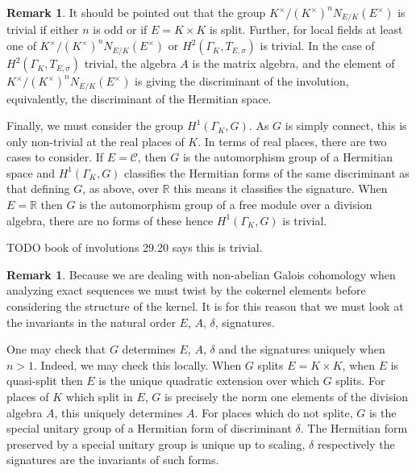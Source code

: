 \documentclass{article}
\theoremstyle{plain}
\theoremstyle{definition}
\newtheorem{remark}[theorem]{Remark}
\numberwithin{equation}{section}
\newcommand{\C}{\mathcal{C}}
\newcommand{\RR}{\mathbb{R}}
\newcommand{\GalKbK}{\Gamma_K}
\begin{document}
\begin{remark}
It should be pointed out that the group $K^\times/(K^\times)^nN_{E/K}(E^\times)$ is trivial if either $n$ is odd or if $E = K\times K$ is split.
Further, for local fields at least one of $K^\times/(K^\times)^nN_{E/K}(E^\times)$ or $H^2(\GalKbK, T_{E,\sigma}) $ is trivial. In the case of $H^2(\GalKbK, T_{E,\sigma}) $ trivial, the algebra $A$ is the matrix algebra, and the element of $K^\times/(K^\times)^nN_{E/K}(E^\times)$ is giving the discriminant of the involution, equivalently, the discriminant of the Hermitian space.
\end{remark} 

Finally, we must consider the group $H^1(\GalKbK,G)$. As $G$ is simply connect, this is only non-trivial at the real places of $K$.
In terms of real places, there are two cases to consider.
If $E=\C$, then $G$ is the automorphism group of a Hermitian space and $H^1(\GalKbK,G)$ classifies the Hermitian forms of the same discriminant as that defining $G$, as above, over $\RR$ this means it classifies the signature.
When $E=\RR$ then $G$ is the automorphism group of a free module over a division algebra, there are no forms of these hence $H^1(\GalKbK,G)$ is trivial. 

TODO book of involutions 29.20 says this is trivial.

\begin{remark}
Because we are dealing with non-abelian Galois cohomology when analyzing exact sequences we must twist by the cokernel elements before considering the structure of the kernel. It is for this reason that we must look at the invariants in the natural order $E$, $A$, $\delta$, signatures.
\end{remark}

One may check that $G$ determines $E$, $A$, $\delta$ and the signatures uniquely when $n>1$. Indeed, we may check this locally.
When $G$ splits $E=K\times K$, when $E$ is quasi-split then $E$ is the unique quadratic extension over which $G$ splits.
For places of $K$ which split in $E$, $G$ is precisely the norm one elements of the division algebra $A$, this uniquely determines $A$.
For places which do not splite, $G$ is the special unitary group of a Hermitian form of discriminant $\delta$.
The Hermitian form preserved by a special unitary group is unique up to scaling, $\delta$ respectively the signatures are the invariants of such forms.
\end{document}
